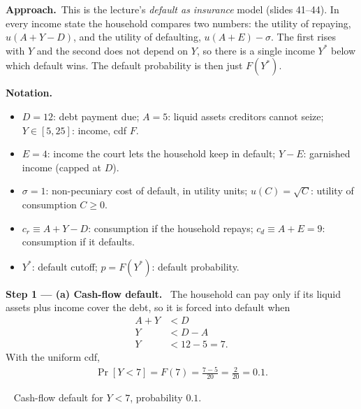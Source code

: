 \documentclass[11pt,a4paper]{article}
\newcommand{\notation}{\par\noindent\textbf{Notation.}}
\newcommand{\step}[2]{\par\medskip\noindent\textbf{Step #1 --- #2.}~}
\newcommand{\approach}{\par\smallskip\noindent\textbf{Approach.}~}
\newcommand{\answer}[1]{\par\smallskip\noindent\fbox{\textbf{Answer #1.}}~}
\begin{document}
\approach This is the lecture's \emph{default as insurance} model (slides 41--44). In every income state the
household compares two numbers: the utility of repaying, $u(A+Y-D)$, and the utility of defaulting,
$u(A+E)-\sigma$. The first rises with $Y$ and the second does not depend on $Y$, so there is a single income
$Y^*$ below which default wins. The default probability is then just $F(Y^*)$.

\notation
\begin{itemize}
  \item $D=12$: debt payment due; $A=5$: liquid assets creditors cannot seize; $Y\in[5,25]$: income, cdf $F$.
  \item $E=4$: income the court lets the household keep in default; $Y-E$: garnished income (capped at $D$).
  \item $\sigma=1$: non-pecuniary cost of default, in utility units; $u(C)=\sqrt C$: utility of consumption $C\ge 0$.
  \item $c_r\equiv A+Y-D$: consumption if the household repays; $c_d\equiv A+E=9$: consumption if it defaults.
  \item $Y^*$: default cutoff; $p=F(Y^*)$: default probability.
\end{itemize}

\step{1}{(a) Cash-flow default} The household can pay only if its liquid assets plus income cover the debt, so
it is forced into default when
\begin{align}
  A+Y &< D \nonumber\\
  Y &< D-A \nonumber\\
  Y &< 12-5 = 7. \label{t4e16-cf}
\end{align}
With the uniform cdf,
\begin{align}
  \Pr[Y<7] = F(7) = \frac{7-5}{20} = \frac{2}{20} = 0.1. \label{t4e16-pcf}
\end{align}

\answer{(a)} Cash-flow default for $Y<7$, probability $0.1$.
\end{document}
